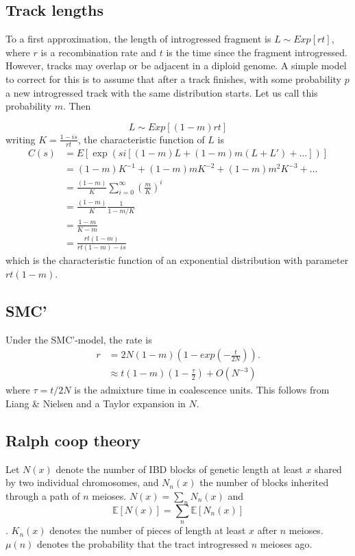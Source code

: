 \documentclass[10pt,a4paper]{article}
\newcommand{\BE}[1]{\mathbb{E}\left[#1\right]}
\begin{document}
\subsection{Track lengths}
To a first approximation, the length of introgressed fragment is 
$L \sim Exp[r t ]$, where $r$ is a recombination rate and $t$ is the time since the fragment introgressed. However, tracks may overlap or be adjacent in a diploid genome. A simple model to correct for this is to assume that after a track finishes, with some probability $p$ a new introgressed track with the same distribution starts. Let us call this probability $m$. Then

\begin{equation}
L \sim Exp[(1-m)rt]
\end{equation}
writing $K = \frac{1-is}{rt}$, the characteristic function of $L$ is
\begin{align}
C(s) &= E[\exp(si [(1-m)L + (1-m)m (L+L')+ \dots  ] )]\nonumber\\
&=(1-m) K^{-1} + (1-m)m K^{-2} +(1-m)m^2 K^{-3} + \dots\nonumber\\
&=\frac{(1-m)}{K} \sum_{i=0}^\infty \left(\frac{m}{K}\right)^{i} \nonumber\\
&= \frac{(1-m)}{K} \frac{1}{1 - m/K}\nonumber\\
&= \frac{1-m}{K-m}\nonumber\\
&= \frac{rt(1-m)}{rt (1-m) - is}\nonumber
\end{align}
which is the characteristic function of an exponential distribution with parameter $rt(1-m)$.

\subsection{SMC'}
Under the SMC'-model, the rate is 
\begin{align}
r &= 2 N (1-m) \left(1 - exp\left({-\frac{t}{2N}}\right)\right).\\
& \approx t (1-m) \left( 1- \frac{\tau}{2}\right) + O\left(N^{-3}\right)
\end{align}
where $\tau = t/2N$ is the admixture time in coalescence units. This follows from Liang \& Nielsen and a Taylor expansion in $N$.


\subsection{Ralph coop theory}
Let $N(x)$ denote the number of IBD blocks of genetic length at least $x$ shared by two individual chromosomes, and $N_n(x)$ the number of blocks inherited through a path of $n$ meioses. $N(x) = \sum_n N_n(x)$ and
$$\BE{N(x)} = \sum_n \BE{N_n(x)}$$. $K_n(x)$ denotes the number of pieces of length at least $x$ after $n$ meioses. $\mu(n)$ denotes the probability that the tract introgressed $n$ meioses ago. 
\end{document}
